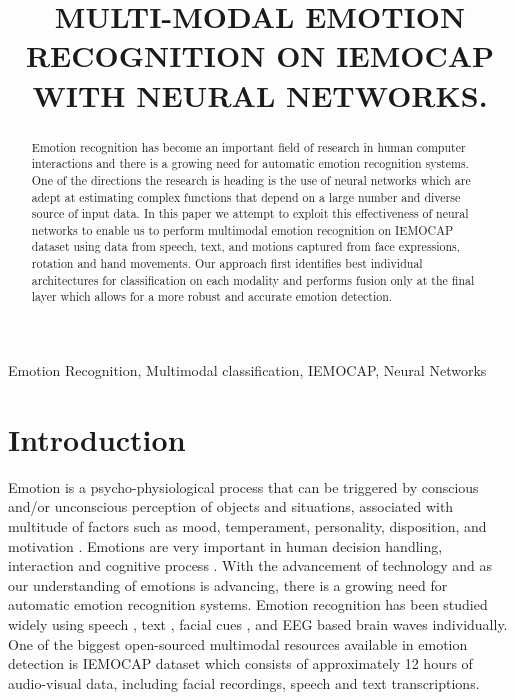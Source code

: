 \documentclass{article}
\title{MULTI-MODAL EMOTION RECOGNITION ON IEMOCAP WITH NEURAL NETWORKS.}
\begin{document}

\address{ Advanced AI, LG Silicon Valley Lab\\
	Santa Clara, California, USA-94041\\
	{\tt samarthtripathi@gmail.com} \\
	 Uber Technologies, Bangalore, India\\
	{\tt sarthaktripathi3.gmail.com}\\
	 Recognition Technologies, Inc.\\
	South Salem, New York, USA-10590  \\
	{\tt beigi@recotechnologies.com } \\
	}


\maketitle
\begin{abstract}
Emotion recognition has become an important field of research in human computer interactions and there is a growing need for automatic emotion recognition systems. One of the directions the research is heading is the use of neural networks which are adept at estimating complex functions that depend on a large number and diverse source of input data. In this paper we attempt to exploit this effectiveness of neural networks to enable us to perform multimodal emotion recognition on IEMOCAP dataset using data from speech, text, and motions captured from face expressions, rotation and hand movements. Our approach first identifies best individual architectures for classification on each modality and performs fusion only at the final layer which allows for a more robust and accurate emotion detection.
\end{abstract}
\begin{keywords}
Emotion Recognition, Multimodal classification, IEMOCAP, Neural Networks
\end{keywords}
\section{Introduction}
\label{sec:intro}

Emotion is a psycho-physiological process that can be triggered by conscious and/or unconscious perception of objects and situations, associated with multitude of factors such as mood, temperament, personality, disposition, and motivation \cite{Soleymani}. Emotions are very important in human decision handling, interaction and cognitive process \cite{Sreeshakthy}. With the advancement of technology and as our understanding of emotions is advancing, there is a growing need for automatic emotion recognition systems. Emotion recognition has been studied widely using speech \cite{Lee} \cite{Chernykh} \cite{Neumann}, text \cite{Kim}, facial cues \cite{Bassili}, and EEG based brain waves \cite{Tripathi} individually.  One of the biggest open-sourced multimodal resources available in emotion detection is IEMOCAP dataset \cite{Busso} which consists of approximately 12 hours of audio-visual data, including facial recordings, speech and text transcriptions. 
\end{document}
